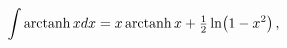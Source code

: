 \[\int\mathop{\mathrm{arctanh}\/}\nolimits xdx=x\mathop{\mathrm{arctanh}\/}%
\nolimits x+\tfrac{1}{2}\mathop{\ln\/}\nolimits\!\left(1-x^{2}\right),\]